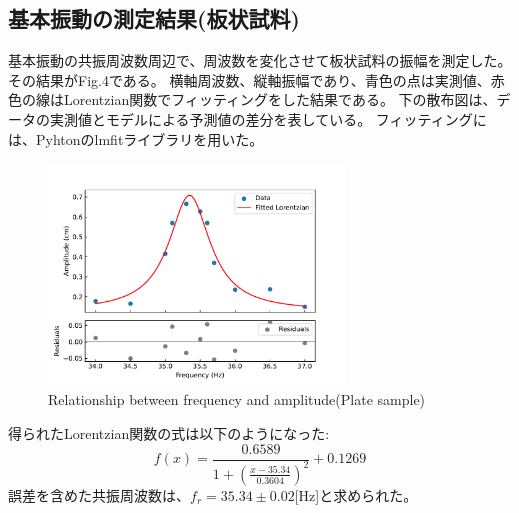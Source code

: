 \documentclass[a4paper,11pt]{jsarticle}
\begin{document}
\subsection{基本振動の測定結果(板状試料)}
基本振動の共振周波数周辺で、周波数を変化させて板状試料の振幅を測定した。
その結果がFig.4である。
横軸周波数、縦軸振幅であり、青色の点は実測値、赤色の線はLorentzian関数でフィッティングをした結果である。
下の散布図は、データの実測値とモデルによる予測値の差分を表している。
フィッティングには、Pyhtonのlmfitライブラリを用いた。

\begin{figure}[H]
  \centering
  \includegraphics[width=0.7\textwidth]{figs/fitting_Lorentzian.pdf}
  \caption{Relationship between frequency and amplitude(Plate sample)}
\end{figure}
得られたLorentzian関数の式は以下のようになった:
\begin{equation}
  f(x) = \frac{0.6589}{1 + (\frac{x - 35.34}{0.3604})^2} + 0.1269 
\end{equation}
誤差を含めた共振周波数は、$f_r = 35.34 \pm 0.02$[Hz]と求められた。
\end{document}
